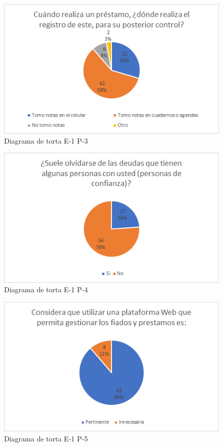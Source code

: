 {{		\begin{figure}[H]
			\centering
			\includegraphics[width=0.8\linewidth]{annexes/e1-p3.png}
			\caption{Diagrama de torta E-1 P-3}
		\end{figure}
	
		\begin{figure}[H]
			\centering
			\includegraphics[width=0.8\linewidth]{annexes/e1-p4.png}
			\caption{Diagrama de torta E-1 P-4}
		\end{figure}
	
		\begin{figure}[H]
			\centering
			\includegraphics[width=0.8\linewidth]{annexes/e1-p5.png}
			\caption{Diagrama de torta E-1 P-5}
		\end{figure}
		}
		
}

